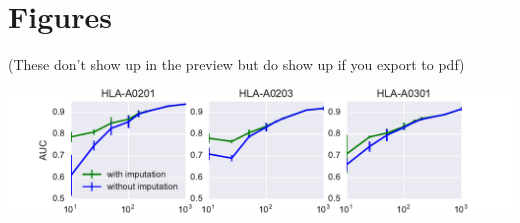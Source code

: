 \section{Figures}
(These don't show up in the preview but do show up if you export to pdf)

\includegraphics{figures/impute_comparison.pdf}
